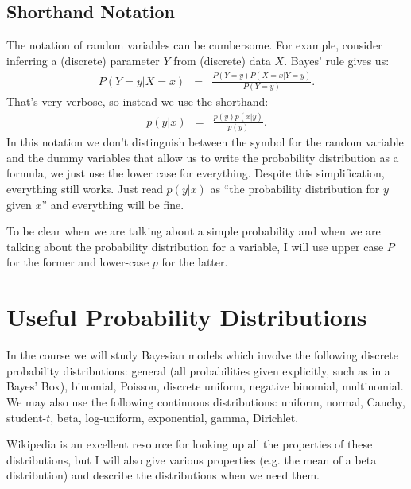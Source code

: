 \subsection{Shorthand Notation}
The notation of random variables can be cumbersome. For example, consider
inferring a (discrete) parameter $Y$ from (discrete) data $X$. Bayes' rule gives us:
\begin{eqnarray}
P(Y=y | X=x) &=& \frac{P(Y=y)P(X=x|Y=y)}{P(Y=y)}.
\end{eqnarray}
That's very verbose, so instead we use the shorthand:
\begin{eqnarray}
p(y | x) &=& \frac{p(y)p(x|y)}{p(y)}.
\end{eqnarray}
In this notation we don't distinguish between the symbol for the random variable
and the dummy variables that allow us to write the probability distribution as
a formula, we just use the lower case for everything. Despite this simplification,
everything still works. Just read
$p(y|x)$ as ``the probability distribution for $y$ given $x$'' and everything
will be fine.

To be clear when we are talking about a simple probability and when we are
talking about the probability distribution for a variable, I will use upper case
$P$ for the former and lower-case $p$ for the latter.

\section{Useful Probability Distributions}
In the course we will study Bayesian models which involve the following
discrete probability distributions: general (all probabilities given explicitly,
such as in a Bayes' Box), binomial, Poisson, discrete uniform,
negative binomial, multinomial.
We may also use the following continuous distributions: uniform, normal,
Cauchy, student-$t$, beta, log-uniform, exponential, gamma, Dirichlet.

Wikipedia is an excellent resource for looking up all the properties of these
distributions, but I will also give various properties (e.g. the mean of a beta
distribution) and describe the distributions when we need them.

